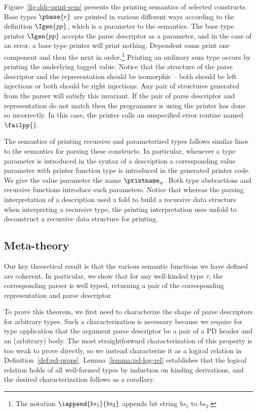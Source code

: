 Figure~\ref{fig:ddc-print-sem} presents the printing semantics of
selected \ddc{} constructs.  Base types $\pbase{e}$ are printed in
various different ways according to the definition
$\Igen{pp}$, which is a parameter to the semantics.  The base type
printer $\Igen{pp}$ accepts the parse descriptor as a parameter, and
in the case of an error, a base type printer will print nothing.
Dependent sums print one component and then the next in order.\footnote{The
notation $\iappend{bs_1}{bs_2}$ appends bit string $bs_1$ to $bs_2$.}
Printing an ordinary sum type occurs by printing the underlying
tagged value.  Notice that the structure of the parse descriptor
and the representation should be isomorphic -- both should be
left injections or both should be right injections.  Any pair
of structures generated from the parser will satisfy this invariant.
If the pair of parse descriptor and representation do not match then the
programmer is using the printer has done so incorrectly.  In this case,
the printer calls an unspecified error routine named $\failpp{}$.

The semantics of printing recursive and parameterized types follows
similar lines to the semantics for parsing these constructs.
In particular, whenever a type parameter is introduced in the syntax
of a description a corresponding value parameter with printer function type 
is introduced in the generated printer code. We give the value parameter
the name $\printname_\alpha$.  Both type abstractions and recursive functions
introduce such parameters.  Notice that whereas the parsing interpretation
of a description used a fold to build a recursive data structure
when interpreting a recursive type, the printing interpretation uses
unfold to deconstruct a recursive data structure for printing.  

\subsection{Meta-theory}
\label{sec:meta-theory}
Our key theoretical result is that the various semantic functions we
have defined are coherent.  In particular, we show that for any 
well-kinded \ddc{} type $\tau$, the corresponding parser is
well typed, returning a pair of the corresponding representation and
parse descriptor.  

To prove this theorem, we first need to characterize the shape of
parse descriptors for arbitrary \ddc{} types.   
Such a characterization is necessary because we require for type
application that the argument parse descriptor be a pair of a PD
header and an (arbitrary) body.
The most straightforward characterization of this property is
too weak to prove directly, so we instead characterize it
as a logical relation in Definition~\ref{def:pd-props}.
Lemma~\ref{lemma:pd-log-rel} establishes that the logical relation
holds of all well-formed \ddc{} types by induction on kinding
derivations, and the desired characterization follows as a corollary.

